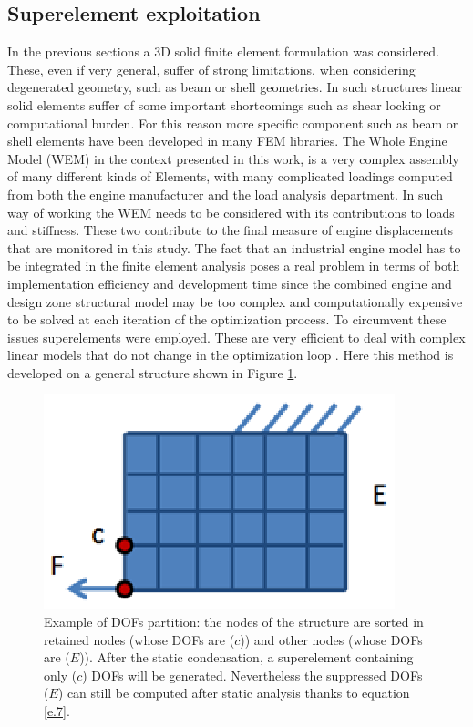 \subsection{Superelement exploitation}
\label{subsection1.4.1}
In the previous sections a 3D solid finite element formulation was considered. These, even if very general, suffer of strong limitations, when considering degenerated geometry, such as beam or shell geometries. In such structures linear solid elements suffer of some important shortcomings such as shear locking or computational burden. For this reason more specific component such as beam or shell elements have been developed in many FEM libraries. The Whole Engine Model (WEM) in the context presented in this work, is a very complex assembly of many different kinds of Elements, with many complicated loadings computed from both the engine manufacturer and the load analysis department. In such way of working the WEM needs to be considered with its contributions to loads and stiffness. These two contribute to the final measure of engine displacements that are monitored in this study.  The fact that an industrial engine model has to be integrated in the finite element analysis poses a real problem in terms of both implementation efficiency and development time since the combined engine and design zone structural model may be too complex and computationally expensive to be solved at each iteration of the optimization process. To circumvent these issues superelements \cite{nastran2013superelements} were employed. These are very efficient to deal with complex linear models that do not change in the optimization loop \cite{krog2004topology}.
Here this method is developed on a general structure shown in Figure \ref{f.3}.
\begin{figure}[hbt!]
\centering
\includegraphics[width=.4\textwidth]{images/Ch1/dof_part.eps}
\caption{Example of DOFs partition: the nodes of the structure are sorted in retained nodes (whose DOFs are ($c$)) and other nodes (whose  DOFs are ($E$)). After the static condensation, a superelement containing only ($c$) DOFs will be generated. Nevertheless the suppressed DOFs ($E$) can still be computed after static analysis thanks to equation \ref{e.7}.  \label{f.3}}
\end{figure}
